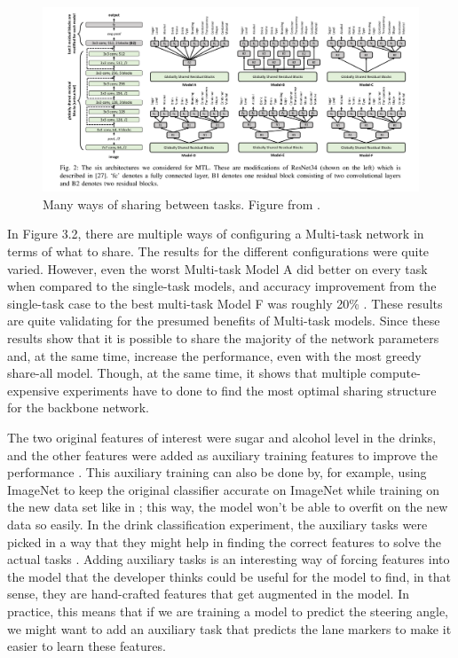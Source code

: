 \begin{figure}[h!]
    \centering
    \includegraphics[width=1\textwidth]{imgs/multipleShares.png}
    \caption{Many ways of sharing between tasks. Figure from \citep{healthyDrink}.\label{fig:params}}
\end{figure}

In Figure 3.2, there are multiple ways of configuring a Multi-task network in terms of what to share.
The results for the different configurations were quite varied.
However, even the worst Multi-task Model A did better on every task when compared to the single-task models, and accuracy improvement from the single-task case to the best multi-task Model F was roughly 20\% \citep{healthyDrink}.
These results are quite validating for the presumed benefits of Multi-task models.
Since these results show that it is possible to share the majority of the network parameters and, at the same time, increase the performance, even with the most greedy share-all model.
Though, at the same time, it shows that multiple compute-expensive experiments have to done to find the most optimal sharing structure for the backbone network.

The two original features of interest were sugar and alcohol level in the drinks, and the other features were added as auxiliary training features to improve the performance \citep{healthyDrink}.
This auxiliary training can also be done by, for example, using ImageNet to keep the original classifier accurate on ImageNet while training on the new data set like in \citep{biologicalMultitask}; this way, the model won't be able to overfit on the new data so easily.
In the drink classification experiment, the auxiliary tasks were picked in a way that they might help in finding the correct features to solve the actual tasks \citep{healthyDrink}.
Adding auxiliary tasks is an interesting way of forcing features into the model that the developer thinks could be useful for the model to find, in that sense, they are hand-crafted features that get augmented in the model.
In practice, this means that if we are training a model to predict the steering angle, we might want to add an auxiliary task that predicts the lane markers to make it easier to learn these features.


